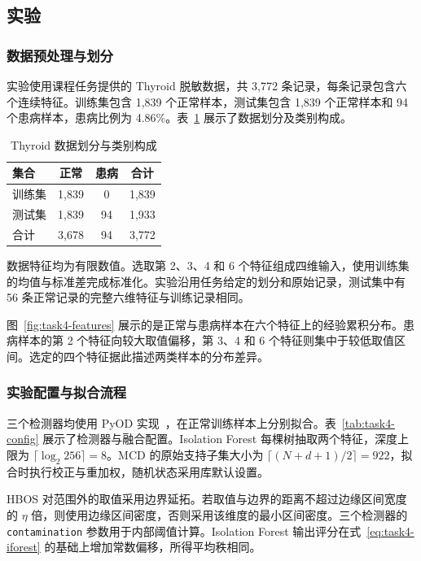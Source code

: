 \subsection{实验}
\label{sec:task4-experiments}

\subsubsection{数据预处理与划分}
实验使用课程任务提供的 Thyroid 脱敏数据，共 3,772 条记录，每条记录包含六个连续特征。训练集包含 1,839 个正常样本，测试集包含 1,839 个正常样本和 94 个患病样本，患病比例为 4.86\%。表~\ref{tab:task4-data} 展示了数据划分及类别构成。

\begin{table}[!htbp]
  \centering
  \caption{Thyroid 数据划分与类别构成}
  \label{tab:task4-data}
  \begin{tabular}{lccc}
    \toprule
    集合 & 正常 & 患病 & 合计 \\
    \midrule
    训练集 & 1,839 & 0 & 1,839 \\
    测试集 & 1,839 & 94 & 1,933 \\
    合计 & 3,678 & 94 & 3,772 \\
    \bottomrule
  \end{tabular}
\end{table}

数据特征均为有限数值。选取第 2、3、4 和 6 个特征组成四维输入，使用训练集的均值与标准差完成标准化。实验沿用任务给定的划分和原始记录，测试集中有 56 条正常记录的完整六维特征与训练记录相同。

图~\ref{fig:task4-features} 展示的是正常与患病样本在六个特征上的经验累积分布。患病样本的第 2 个特征向较大取值偏移，第 3、4 和 6 个特征则集中于较低取值区间。选定的四个特征据此描述两类样本的分布差异。


\subsubsection{实验配置与拟合流程}
三个检测器均使用 PyOD 实现~\cite{zhao2019pyod}，在正常训练样本上分别拟合。表~\ref{tab:task4-config} 展示了检测器与融合配置。Isolation Forest 每棵树抽取两个特征，深度上限为 $\lceil\log_2 256\rceil=8$。MCD 的原始支持子集大小为 $\lceil(N+d+1)/2\rceil=922$，拟合时执行校正与重加权，随机状态采用库默认设置。

HBOS 对范围外的取值采用边界延拓。若取值与边界的距离不超过边缘区间宽度的 $\eta$ 倍，则使用边缘区间密度，否则采用该维度的最小区间密度。三个检测器的 \texttt{contamination} 参数用于内部阈值计算。Isolation Forest 输出评分在式~\eqref{eq:task4-iforest} 的基础上增加常数偏移，所得平均秩相同。

